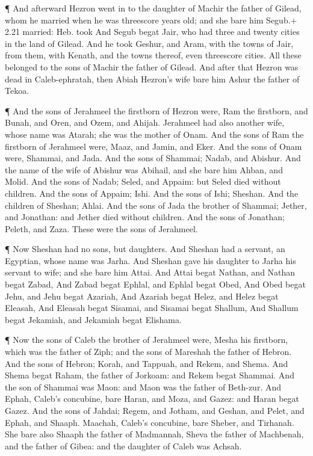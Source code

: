  ¶ And afterward Hezron went in to the daughter of Machir
the father of Gilead, whom he married when he was threescore years old;
and she bare him Segub.+ 2.21 married: Heb. took  And Segub
begat Jair, who had three and twenty cities in the land of Gilead.
 And he took Geshur, and Aram, with the towns of Jair, from
them, with Kenath, and the towns thereof, even threescore cities. All
these belonged to the sons of Machir the father of Gilead. 
And after that Hezron was dead in Caleb-ephratah, then Abiah Hezron's
wife bare him Ashur the father of Tekoa.

 ¶ And the sons of Jerahmeel the firstborn of Hezron were,
Ram the firstborn, and Bunah, and Oren, and Ozem, and Ahijah.
 Jerahmeel had also another wife, whose name was Atarah;
she was the mother of Onam.  And the sons of Ram the
firstborn of Jerahmeel were, Maaz, and Jamin, and Eker. 
And the sons of Onam were, Shammai, and Jada. And the sons of Shammai;
Nadab, and Abishur.  And the name of the wife of Abishur
was Abihail, and she bare him Ahban, and Molid.  And the
sons of Nadab; Seled, and Appaim: but Seled died without children.
 And the sons of Appaim; Ishi. And the sons of Ishi;
Sheshan. And the children of Sheshan; Ahlai.  And the sons
of Jada the brother of Shammai; Jether, and Jonathan: and Jether died
without children.  And the sons of Jonathan; Peleth, and
Zaza. These were the sons of Jerahmeel.

 ¶ Now Sheshan had no sons, but daughters. And Sheshan had
a servant, an Egyptian, whose name was Jarha.  And Sheshan
gave his daughter to Jarha his servant to wife; and she bare him Attai.
 And Attai begat Nathan, and Nathan begat Zabad,
 And Zabad begat Ephlal, and Ephlal begat Obed,
 And Obed begat Jehu, and Jehu begat Azariah, 
And Azariah begat Helez, and Helez begat Eleasah,  And
Eleasah begat Sisamai, and Sisamai begat Shallum,  And
Shallum begat Jekamiah, and Jekamiah begat Elishama.

 ¶ Now the sons of Caleb the brother of Jerahmeel were,
Mesha his firstborn, which was the father of Ziph; and the sons of
Mareshah the father of Hebron.  And the sons of Hebron;
Korah, and Tappuah, and Rekem, and Shema.  And Shema begat
Raham, the father of Jorkoam: and Rekem begat Shammai.  And
the son of Shammai was Maon: and Maon was the father of Beth-zur.
 And Ephah, Caleb's concubine, bare Haran, and Moza, and
Gazez: and Haran begat Gazez.  And the sons of Jahdai;
Regem, and Jotham, and Geshan, and Pelet, and Ephah, and Shaaph.
 Maachah, Caleb's concubine, bare Sheber, and Tirhanah.
 She bare also Shaaph the father of Madmannah, Sheva the
father of Machbenah, and the father of Gibea: and the daughter of Caleb
was Achsah.

